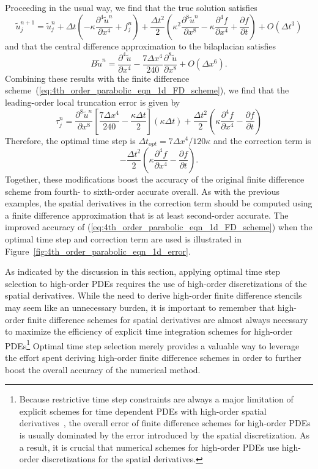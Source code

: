 \documentclass[fleqn,12pt,twoside]{article}
\newcommand{\beq}{\begin{equation}}
\newcommand{\eeq}{\end{equation}}
\def\pt{\partial t}
\def\px{\partial x}
\def\tu{\tilde{u}}
\def\dt{\Delta t}
\def\dx{\Delta x}
\def\dto{\dt_{opt}}
\begin{document}
Proceeding in the usual way, we find that the true solution satisfies
\beq
  \tu^{n+1}_j = \tu^{n}_j 
  + \dt \left( -\kappa \frac{\partial^4 \tu^n}{\px^4}  
             + f^n_j
        \right)
  + \frac{\dt^2}{2} 
    \left(
      \kappa^2 \frac{\partial^8 \tu^n}{\px^8} 
    - \kappa \frac{\partial^4 f}{\px^4} 
    + \frac{\partial f}{\pt}
    \right)
  + O \left( \dt^3 \right)
  \label{eq:4th_order_parabolic_eqn_1d_time_err}
\eeq
and that the central difference approximation to the bilaplacian satisfies
\beq
  B \tu^n = \frac{\partial^4 \tu}{\px^4} 
  - \frac{7 \dx^4}{240} 
    \frac{\partial^8 \tu}{\px^8} 
  + O(\dx^6)
  \label{eq:4th_order_parabolic_eqn_1d_space_err}.
\eeq
Combining these results with the finite difference 
scheme~(\ref{eq:4th_order_parabolic_eqn_1d_FD_scheme}), we find that the
leading-order local truncation error is given by
\beq
  \tau^n_j = 
     \frac{\partial^8 \tu^n}{\px^8} 
    \left[ \frac{7 \dx^4}{240} - \frac{\kappa \dt}{2}  \right] (\kappa \dt)
    + \frac{\dt^2}{2} 
        \left( \kappa \frac{\partial^4 f}{\px^4} 
             - \frac{\partial f}{\pt}
        \right)
  \label{eq:4th_order_parabolic_eqn_1d_err_eqn}
\eeq
Therefore, the optimal time step is $\dto = 7 \dx^4/120\kappa$ and the 
correction term is 
\beq
  - \frac{\dt^2}{2} 
      \left( \kappa \frac{\partial^4 f}{\px^4} 
           - \frac{\partial f}{\pt}
      \right).
\eeq
Together, these modifications boost the accuracy of the original
finite difference scheme from fourth- to sixth-order accurate 
overall.  As with the previous examples, the spatial derivatives in the 
correction term should be computed using a finite difference approximation 
that is at least second-order accurate.  
The improved accuracy of (\ref{eq:4th_order_parabolic_eqn_1d_FD_scheme}) 
when the optimal time step and correction term are used is illustrated in 
Figure~\ref{fig:4th_order_parabolic_eqn_1d_error}. 

As indicated by the discussion in this section, applying optimal time step 
selection to high-order PDEs requires the use of high-order discretizations
of the spatial derivatives.  While the need to derive high-order finite 
difference stencils may seem like an unnecessary burden, it is important
to remember that high-order finite difference schemes for spatial derivatives
are almost always necessary to maximize the efficiency of explicit time
integration schemes for high-order PDEs\footnote{Because restrictive time 
step constraints are always a major limitation of explicit schemes for 
time dependent PDEs with high-order spatial 
derivatives~\cite{gko_book,greer_2006}, 
the overall error of finite difference schemes for high-order PDEs is usually 
dominated by the error introduced by the spatial discretization.  As a result, 
it is crucial that numerical schemes for high-order PDEs use high-order 
discretizations for the spatial derivatives.}
Optimal time step selection merely provides a valuable way to leverage the 
effort spent deriving high-order finite difference schemes in order to further 
boost the overall accuracy of the numerical method.
\end{document}
